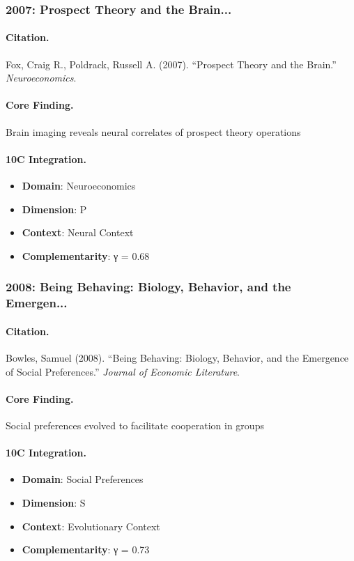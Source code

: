 \subsubsection{2007: Prospect Theory and the Brain...}

\paragraph{Citation.}
Fox, Craig R., Poldrack, Russell A. (2007). ``Prospect Theory and the Brain.''
\textit{Neuroeconomics}.

\paragraph{Core Finding.}
Brain imaging reveals neural correlates of prospect theory operations

\paragraph{10C Integration.}
\begin{itemize}[nosep]
  \item \textbf{Domain}: Neuroeconomics
  \item \textbf{Dimension}: P
  \item \textbf{Context}: Neural Context
  \item \textbf{Complementarity}: γ = 0.68
\end{itemize}

\subsubsection{2008: Being Behaving: Biology, Behavior, and the Emergen...}

\paragraph{Citation.}
Bowles, Samuel (2008). ``Being Behaving: Biology, Behavior, and the Emergence of Social Preferences.''
\textit{Journal of Economic Literature}.

\paragraph{Core Finding.}
Social preferences evolved to facilitate cooperation in groups

\paragraph{10C Integration.}
\begin{itemize}[nosep]
  \item \textbf{Domain}: Social Preferences
  \item \textbf{Dimension}: S
  \item \textbf{Context}: Evolutionary Context
  \item \textbf{Complementarity}: γ = 0.73
\end{itemize}

